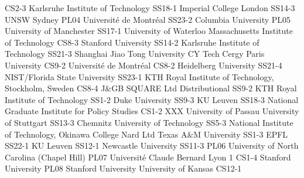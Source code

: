 \begin{multicols}{2}
{CS2-3}
{}
{ Karlsruhe Institute of Technology }
{SS18-1}
{}
{ Imperial College London }
{SS14-3}
{}
{ UNSW Sydney }
{PL04}
{}
{ Université de Montréal }
{SS23-2}
{}
{ Columbia University }
{PL05}
{}
{ University of Manchester }
{SS17-1}
{}
{ University of Waterloo }
{}
{}
{ Massachusetts Institute of Technology }
{CS8-3}
{}
{ Stanford University }
{SS14-2}
{}
{ Karlsruhe Institute of Technology }
{SS21-3}
{}
{ Shanghai Jiao Tong University }
{}
{}
{ CY Tech Cergy Paris University }
{CS9-2}
{}
{ Université de Montréal }
{CS8-2}
{}
{ Heidelberg University }
{SS21-4}
{}
{ NIST/Florida State University }
{SS23-1}
{}
{ KTH Royal Institute of Technology, Stockholm, Sweden }
{CS8-4}
{}
{ J\&GB SQUARE Ltd }
{}
{}
{ Distributional }
{SS9-2}
{}
{ KTH Royal Institute of Technology }
{SS1-2}
{}
{ Duke University }
{SS9-3}
{}
{ KU Leuven }
{SS18-3}
{}
{ National Graduate Institute for Policy Studies }
{CS1-2}
{}
{ XXX }
{  }
{}
{ University of Passau }
{}
{}
{ University of Stuttgart }
{SS13-3}
{}
{ Chemnitz University of Technology }
{SS5-3}
{}
{ National Institute of Technology, Okinawa College }
{}
{}
{ Nard Ltd }
{}
{}
{ Texas A\&M University }
{SS1-3}
{}
{ EPFL }
{SS22-1}
{}
{ KU Leuven }
{SS12-1}
{}
{ Newcastle University }
{SS11-3}
{PL06}
{ University of North Carolina (Chapel Hill) }
{PL07}
{}
{ Université Claude Bernard Lyon 1 }
{CS1-4}
{}
{ Stanford University }
{PL08}
{}
{ Stanford University }
{}
{}
{ University of Kansas }
{CS12-1}
{}

\end{multicols}
